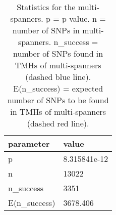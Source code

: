 \begin{table}

\caption{\label{tab:snp_stats_per_spanner_multi}Statistics for the multi-spanners. p = p value. n = number of SNPs in multi-spanners. n\_success = number of SNPs found in TMHs of multi-spanners (dashed blue line). E(n\_success) = expected number of SNPs to be found in TMHs of multi-spanners  (dashed red line). }
\centering
\begin{tabular}[t]{l|l}
\hline
parameter & value\\
\hline
p & 8.315841e-12\\
\hline
n & 13022\\
\hline
n\_success & 3351\\
\hline
E(n\_success) & 3678.406\\
\hline
\end{tabular}
\end{table}